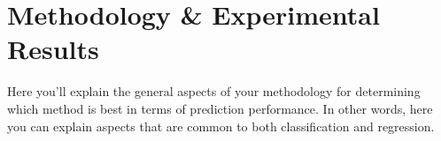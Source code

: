 \section{Methodology \& Experimental Results}

Here you'll explain the general aspects of your methodology for determining which
method is best in terms of prediction performance.
In other words, here you can explain aspects that are common to both classification and regression.